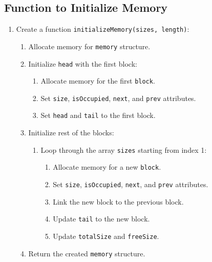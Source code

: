 \subsection{Function to Initialize Memory}
\begin{enumerate}[label=\arabic*.,left=0pt]
  \item Create a function \texttt{initializeMemory(sizes, length)}:
        \begin{enumerate}[label=2.\arabic*.,left=0pt]
          \item Allocate memory for \texttt{memory} structure.
          \item Initialize \texttt{head} with the first block:
                \begin{enumerate}[label=2.2.\arabic*.,left=0pt]
                  \item Allocate memory for the first \texttt{block}.
                  \item Set \texttt{size}, \texttt{isOccupied}, \texttt{next}, and \texttt{prev} attributes.
                  \item Set \texttt{head} and \texttt{tail} to the first block.
                \end{enumerate}
          \item Initialize rest of the blocks:
                \begin{enumerate}[label=2.3.\arabic*.,left=0pt]
                  \item Loop through the array \texttt{sizes} starting from index 1:
                        \begin{enumerate}[label=2.3.\arabic*.,left=0pt]
                          \item Allocate memory for a new \texttt{block}.
                          \item Set \texttt{size}, \texttt{isOccupied}, \texttt{next}, and \texttt{prev} attributes.
                          \item Link the new block to the previous block.
                          \item Update \texttt{tail} to the new block.
                          \item Update \texttt{totalSize} and \texttt{freeSize}.
                        \end{enumerate}
                \end{enumerate}
          \item Return the created \texttt{memory} structure.
        \end{enumerate}
\end{enumerate}

